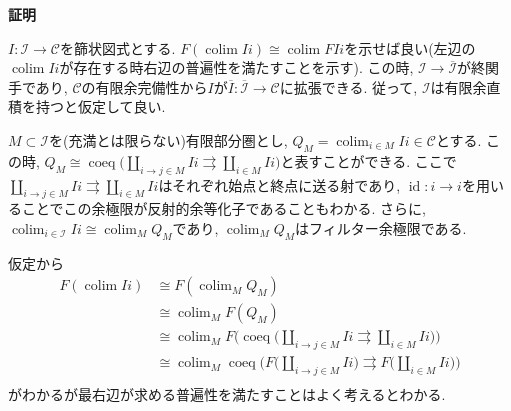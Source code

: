 \documentclass{ltjsarticle}
\makeatletter
\theoremstyle{mystyle}
\renewcommand{\proofname}{\textbf{証明}}
\renewenvironment{proof}[1][\proofname]{\par
  \pushQED{\qed}
  \normalfont \topsep6\p@\@plus6\p@\relax
  \trivlist
  \item\relax
  {#1\@addpunct{\newline\ignorespaces}}%
}{
  \popQED\endtrivlist\@endpefalse
}
\makeatother
\begin{document}
\begin{proof}
  $I:\mathcal I\to\mathcal C$を篩状図式とする. $F(\operatorname{colim}Ii)\cong\operatorname{colim}FIi$を示せば良い(左辺の$\operatorname{colim}Ii$が存在する時右辺の普遍性を満たすことを示す).
  この時, $\mathcal I\to\overline{\mathcal I}$が終関手であり, $\mathcal C$の有限余完備性から$I$が$\overline{I}:\overline{\mathcal I}\to\mathcal C$に拡張できる.
  従って, $\mathcal I$は有限余直積を持つと仮定して良い.

  $M\subset \mathcal I$を(充満とは限らない)有限部分圏とし, $Q_M=\operatorname{colim}_{i\in M}Ii\in \mathcal C$とする.
  この時, $Q_M\cong\operatorname{coeq}\bigg(\coprod_{i\to j\in M}Ii\rightrightarrows \coprod_{i\in M}Ii\bigg)$と表すことができる.
  ここで$\coprod_{i\to j\in M}Ii\rightrightarrows \coprod_{i\in M}Ii$はそれぞれ始点と終点に送る射であり, $\operatorname{id}:i\to i$を用いることでこの余極限が反射的余等化子であることもわかる.
  さらに, $\operatorname{colim}_{i\in\mathcal I}Ii\cong\operatorname{colim}_{M}Q_M$であり, $\operatorname{colim}_{M}Q_M$はフィルター余極限である.

  仮定から
  \begin{align*}
  F(\operatorname{colim}Ii)&\cong F(\operatorname{colim}_{M}Q_M)\\
  &\cong \operatorname{colim}_{M}F(Q_M)\\
  &\cong \operatorname{colim}_{M}F\bigg(\operatorname{coeq}\bigg(\coprod_{i\to j\in M}Ii\rightrightarrows \coprod_{i\in M}Ii\bigg)\bigg)\\
  &\cong \operatorname{colim}_{M}\operatorname{coeq}\bigg(F\bigg(\coprod_{i\to j\in M}Ii\bigg)\rightrightarrows F\bigg(\coprod_{i\in M}Ii\bigg)\bigg)\\
  \end{align*}
  がわかるが最右辺が求める普遍性を満たすことはよく考えるとわかる.
\end{proof}
\end{document}
